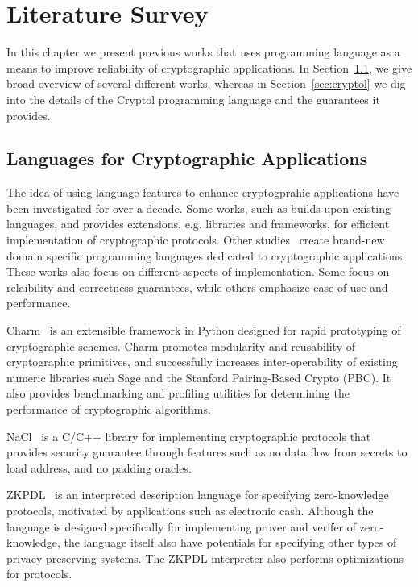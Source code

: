 \documentclass[a4paper, notitlepage]{report}
\begin{document}
\newpage
\chapter{Literature Survey}

In this chapter we present previous works that uses programming
language as a means to improve reliability of cryptographic applications.
In Section~\ref{sec:crypto_lang}, we give broad overview of several different
works, whereas in Section~\ref{sec:cryptol} we dig into the details of
the Cryptol programming language and the guarantees it provides.

\section{Languages for Cryptographic Applications}
\label{sec:crypto_lang}

The idea of using language features to enhance cryptogprahic applications 
have been investigated for over a decade. Some works, such 
as \cite{akinyele2013charm} builds upon existing languages, and provides
extensions, e.g. libraries and frameworks, for efficient implementation 
of cryptographic protocols. 
Other studies~\cite{lewis2003cryptol} create brand-new domain specific 
programming languages dedicated to cryptographic applications. These
works also focus on different aspects of implementation. Some focus
on relaibility and correctness guarantees, while others emphasize ease 
of use and performance.

Charm~\cite{akinyele2013charm} is an extensible framework in Python 
designed for rapid prototyping of cryptographic schemes. Charm promotes
modularity and reusability of cryptographic primitives, and successfully 
increases inter-operability of existing numeric libraries such Sage and
the Stanford Pairing-Based Crypto (PBC). It also provides benchmarking
and profiling utilities for determining the performance of cryptographic
algorithms.

NaCl~\cite{bernstein2012security} is a C/C++ library for implementing 
cryptographic protocols that 
provides security guarantee through features such as no data flow from 
secrets to load address, and no padding oracles. 

ZKPDL~\cite{meiklejohn2010zkpdl} is an interpreted description language 
for specifying zero-knowledge protocols, motivated by applications such
as electronic cash. Although the language is designed specifically for
implementing prover and verifer of zero-knowledge, the language itself 
also have potentials for specifying other types of privacy-preserving 
systems. The ZKPDL interpreter also performs optimizations for protocols.
\end{document}
